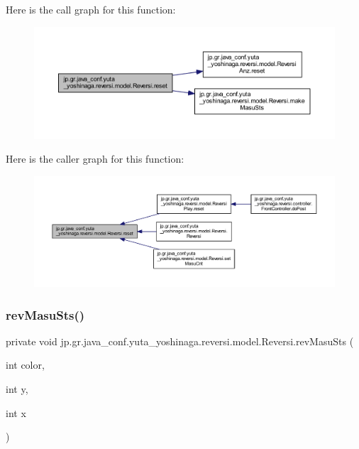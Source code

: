 Here is the call graph for this function\+:
\nopagebreak
\begin{figure}[H]
\begin{center}
\leavevmode
\includegraphics[width=350pt]{classjp_1_1gr_1_1java__conf_1_1yuta__yoshinaga_1_1reversi_1_1model_1_1_reversi_a497552844cbae36207f2d8c836a26b8e_cgraph}
\end{center}
\end{figure}
Here is the caller graph for this function\+:
\nopagebreak
\begin{figure}[H]
\begin{center}
\leavevmode
\includegraphics[width=350pt]{classjp_1_1gr_1_1java__conf_1_1yuta__yoshinaga_1_1reversi_1_1model_1_1_reversi_a497552844cbae36207f2d8c836a26b8e_icgraph}
\end{center}
\end{figure}
\mbox{\label{classjp_1_1gr_1_1java__conf_1_1yuta__yoshinaga_1_1reversi_1_1model_1_1_reversi_a3c63579c27513dffc555416388f8530a}} 
\subsubsection{\texorpdfstring{rev\+Masu\+Sts()}{revMasuSts()}}
{\footnotesize\ttfamily private void jp.\+gr.\+java\+\_\+conf.\+yuta\+\_\+yoshinaga.\+reversi.\+model.\+Reversi.\+rev\+Masu\+Sts (\begin{DoxyParamCaption}\item[{int}]{color,  }\item[{int}]{y,  }\item[{int}]{x }\end{DoxyParamCaption})\hspace{0.3cm}{\ttfamily [private]}}



